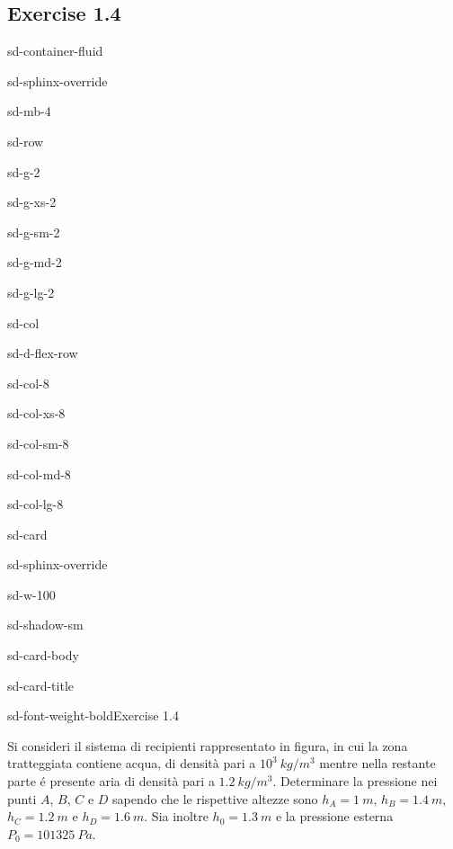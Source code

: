 \documentclass[letterpaper,10pt,italian]{jupyterBook}
\begin{document}
\subsection{Exercise 1.4}
\label{\detokenize{polimi/fluidmechanics-ita/template/capitoli/01_statica/0204in:exercise-1-4}}\label{\detokenize{polimi/fluidmechanics-ita/template/capitoli/01_statica/0204in:fluid-mechanics-statics-ex-04}}\label{\detokenize{polimi/fluidmechanics-ita/template/capitoli/01_statica/0204in::doc}}
\begin{sphinxuseclass}{sd-container-fluid}
\begin{sphinxuseclass}{sd-sphinx-override}
\begin{sphinxuseclass}{sd-mb-4}
\begin{sphinxuseclass}{sd-row}
\begin{sphinxuseclass}{sd-g-2}
\begin{sphinxuseclass}{sd-g-xs-2}
\begin{sphinxuseclass}{sd-g-sm-2}
\begin{sphinxuseclass}{sd-g-md-2}
\begin{sphinxuseclass}{sd-g-lg-2}
\begin{sphinxuseclass}{sd-col}
\begin{sphinxuseclass}{sd-d-flex-row}
\begin{sphinxuseclass}{sd-col-8}
\begin{sphinxuseclass}{sd-col-xs-8}
\begin{sphinxuseclass}{sd-col-sm-8}
\begin{sphinxuseclass}{sd-col-md-8}
\begin{sphinxuseclass}{sd-col-lg-8}
\begin{sphinxuseclass}{sd-card}
\begin{sphinxuseclass}{sd-sphinx-override}
\begin{sphinxuseclass}{sd-w-100}
\begin{sphinxuseclass}{sd-shadow-sm}
\begin{sphinxuseclass}{sd-card-body}
\begin{sphinxuseclass}{sd-card-title}
\begin{sphinxuseclass}{sd-font-weight-bold}Exercise 1.4
\end{sphinxuseclass}
\end{sphinxuseclass}
\sphinxAtStartPar
Si consideri il sistema di recipienti rappresentato in figura, in cui
la zona tratteggiata contiene acqua, di densità pari a \(10^3\ kg/m^3\) mentre nella restante parte é
presente aria di densità pari a \(1.2\ kg/m^3\). Determinare la pressione nei punti \(A\), \(B\), \(C\) e \(D\)
sapendo che le rispettive altezze sono \(h_A=1\ m\), \(h_B=1.4\ m\),
\(h_C=1.2\ m\) e \(h_D=1.6\ m\). Sia inoltre \(h_0=1.3\ m\) e la pressione
esterna \(P_0=101325\ Pa\).


\end{sphinxuseclass}
\end{sphinxuseclass}
\end{sphinxuseclass}
\end{sphinxuseclass}
\end{sphinxuseclass}
\end{sphinxuseclass}
\end{sphinxuseclass}
\end{sphinxuseclass}
\end{sphinxuseclass}
\end{sphinxuseclass}
\end{sphinxuseclass}
\end{sphinxuseclass}
\end{sphinxuseclass}
\end{sphinxuseclass}
\end{sphinxuseclass}
\end{sphinxuseclass}
\end{sphinxuseclass}
\end{sphinxuseclass}
\end{sphinxuseclass}
\end{sphinxuseclass}
\end{sphinxuseclass}
\end{document}
